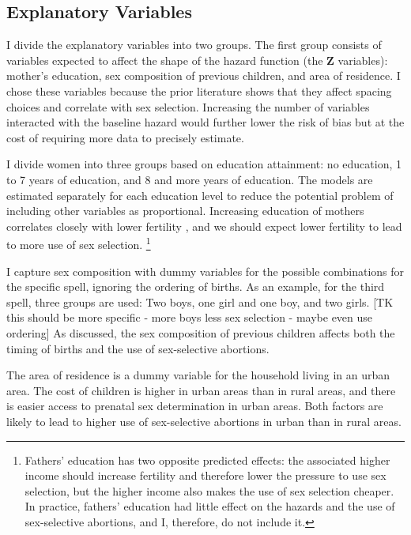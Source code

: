 \documentclass[12pt,letterpaper]{article}
\begin{document}
\subsection{Explanatory Variables}

I divide the explanatory variables into two groups.
The first group consists of variables expected to affect the shape of the hazard function
(the $\mathbf{Z}$ variables): 
mother's education, sex composition of previous children, and area of residence.
I chose these variables because the prior literature shows that they affect 
spacing choices and correlate with sex selection.
Increasing the number of variables interacted with the baseline hazard would
further lower the risk of bias but at the cost of requiring more data to 
precisely estimate.

I divide women into three groups based on education attainment: no
education, 1 to 7 years of education, and 8 and more years of education.
The models are estimated separately for each education level to reduce
the potential problem of including other variables as proportional.
Increasing education of mothers correlates closely with lower fertility 
\citep{schultz97}, and 
we should expect lower fertility to lead to more use of sex selection.%
\footnote{
Fathers' education has two opposite predicted effects: the associated higher income
should increase fertility and therefore lower the pressure to use sex selection, but
the higher income also makes the use of sex selection cheaper.
In practice, fathers' education had little effect on the hazards and the use of 
sex-selective abortions, and I, therefore, do not include it.
}

I capture sex composition with dummy variables for the
possible combinations for the specific spell, ignoring the ordering of births.
As an example, for the third spell, three groups are used: Two boys,
one girl and one boy, and two girls.
[TK this should be more specific - more boys less sex selection - maybe even use ordering]
As discussed, the sex composition of previous children affects both the timing
of births and the use of sex-selective abortions.

The area of residence is a dummy variable for the household living in
an urban area.
The cost of children is higher in urban areas than in rural areas, and 
there is easier access to prenatal sex determination in urban areas.
Both factors are likely to lead to higher use of sex-selective abortions
in urban than in rural areas.
\end{document}
